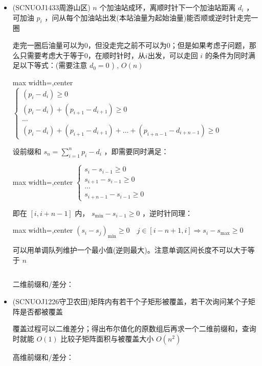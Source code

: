\documentclass[twocolumn,10pt]{ctexart}
\begin{document}
\begin{itemize}
\item (SCNUOJ1433周游山区) $n$ 个加油站成环，离顺时针下一个加油站距离 $d_i$ ，可加油 $p_i$ ，问从每个加油站出发(本站油量为起始油量)能否顺或逆时针走完一圈

走完一圈后油量可以为0，但没走完之前不可以为0；但是如果考虑子问题，那么只需要考虑大于等于0，在顺时针时，从$i$出发，可以走回 $i$ 的条件为同时满足以下等式：(需要注意 $d_0=0$ ) , $O(n)$

\begin{adjustbox}{max width=\linewidth,center}
$\begin{cases}
(p_i-d_{i})\ge0\\
(p_i-d_{i})+(p_{i+1}-d_{i+1})\ge0\\
\dots\\
(p_i-d_{i})+(p_{i+1}-d_{i+1})+\dots+(p_{i+n-1}-d_{i+n-1})\ge0
\end{cases}$
\end{adjustbox}

设前缀和 $s_n=\sum_{i=1}^n p_i-d_i$ ，即需要同时满足：

\begin{adjustbox}{max width=\linewidth,center}
$\begin{cases}
s_i-s_{i-1}\ge0\\
s_{i+1}-s_{i-1}\ge0\\
\dots\\
s_{i+n-1}-s_{i-1}\ge0
\end{cases}$
\end{adjustbox}

即在 $[i,i+n-1]$ 内， $s_{\min}-s_{i-1}\ge0$  ，逆时针同理：

\begin{adjustbox}{max width=\linewidth,center}
$(s_i-s_j)_{\min}\ge0\quad j\in[i-n+1,i]\Rightarrow s_i-s_{\max}\ge0$
\end{adjustbox}

可以用单调队列维护一个最小值(逆则最大)。注意单调区间长度不可以大于等于 $n$

\inputminted{cpp}{code/ext_071.cpp}

二维前缀和/差分：
\end{itemize}

\begin{itemize}
\item (SCNUOJ1226守卫农田)矩阵内有若干个子矩形被覆盖，若干次询问某个子矩阵是否都被覆盖

覆盖过程可以二维差分；得出布尔值化的原数组后再求一个二维前缀和，查询时就能 $O(1)$ 比较子矩阵面积与被覆盖大小 $O(n^2)$

高维前缀和/差分：
\end{itemize}
\end{document}
